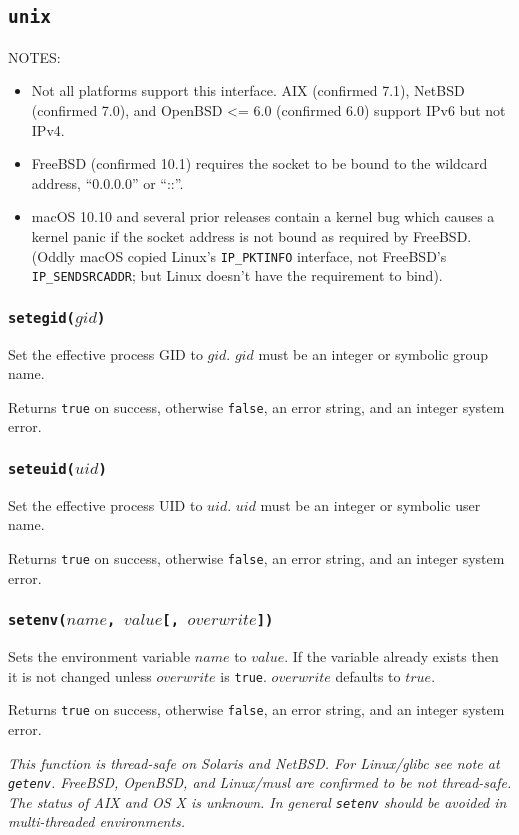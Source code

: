 \documentclass[11pt, oneside]{memoir}
\newcommand*{\true}[0]{\texttt{true}\xspace}
\newcommand*{\false}[0]{\texttt{false}\xspace}
\newcommand*{\fn}[1]{\texttt{#1}\xspace}
\newcounter{toccols}
\newenvironment{Module}[1]{
	\subsection{\texttt{#1}}
	\addtocontents{toc}{
		\protect\begin{multicols}{\value{toccols}}
	}
}{
	\addtocontents{toc}{\protect\end{multicols}}
}
\begin{document}
\begin{Module}{unix}
NOTES:
\begin{itemize}
\item Not all platforms support this interface. AIX (confirmed 7.1), NetBSD (confirmed 7.0), and OpenBSD <= 6.0 (confirmed 6.0) support IPv6 but not IPv4.
\item FreeBSD (confirmed 10.1) requires the socket to be bound to the wildcard address, ``0.0.0.0'' or ``::''.
\item macOS 10.10 and several prior releases contain a kernel bug which causes a kernel panic if the socket address is not bound as required by FreeBSD. (Oddly macOS copied Linux's \texttt{IP\_PKTINFO} interface, not FreeBSD's \texttt{IP\_SENDSRCADDR}; but Linux doesn't have the requirement to bind).
\end{itemize}

\subsubsection[\fn{setegid}]{\fn{setegid($gid$)}}

Set the effective process GID to $gid$. $gid$ must be an integer or symbolic group name.

Returns \true on success, otherwise \false, an error string, and an integer system error.

\subsubsection[\fn{seteuid}]{\fn{seteuid($uid$)}}

Set the effective process UID to $uid$. $uid$ must be an integer or symbolic user name.

Returns \true on success, otherwise \false, an error string, and an integer system error.

\subsubsection[\fn{setenv}]{\fn{setenv($name$, $value$[, $overwrite$])}}

Sets the environment variable $name$ to $value$. If the variable already exists then it is not changed unless $overwrite$ is \true. $overwrite$ defaults to $true$.

Returns \true on success, otherwise \false, an error string, and an integer system error.

\emph{This function is thread-safe on Solaris and NetBSD. For Linux/glibc see note at \fn{getenv}. FreeBSD, OpenBSD, and Linux/musl are confirmed to be not thread-safe. The status of AIX and OS X is unknown. In general \fn{setenv} should be avoided in multi-threaded environments.}


\end{Module}
\end{document}
